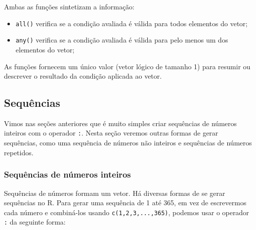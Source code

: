 \documentclass[]{book}
\providecommand{\tightlist}{%
  \setlength{\itemsep}{0pt}\setlength{\parskip}{0pt}}
\begin{document}
Ambas as funções sintetizam a informação:

\begin{itemize}
\tightlist
\item
  \texttt{all()} verifica se a condição avaliada é válida para todos
  elementos do vetor;
\item
  \texttt{any()} verifica se a condição avaliada é válida para pelo
  menos um dos elementos do vetor;
\end{itemize}

As funções fornecem um único valor (vetor lógico de tamanho 1) para
resumir ou descrever o resultado da condição aplicada ao vetor.

\subsection{Sequências}\label{sequencias}

Vimos nas seções anteriores que é muito simples criar sequências de
números inteiros com o operador \texttt{:}. Nesta seção veremos outras
formas de gerar sequências, como uma sequência de números não inteiros e
sequências de números repetidos.

\subsubsection{Sequências de números
inteiros}\label{sequencias-de-numeros-inteiros}

Sequências de números formam um vetor. Há diversas formas de se gerar
sequências no R. Para gerar uma sequência de 1 até 365, em vez de
escrevermos cada número e combiná-los usando \texttt{c(1,2,3,...,365)},
podemos usar o operador \texttt{:} da seguinte forma:
\end{document}
